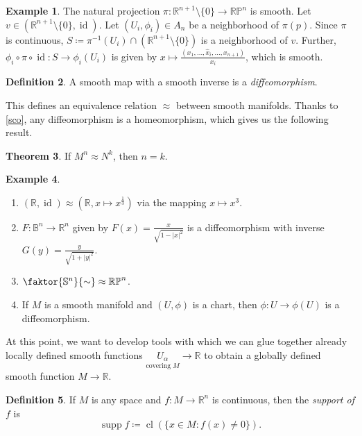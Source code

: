 \documentclass[10pt,letterpaper,cm]{nupset}
\theoremstyle{definition}
\newtheorem{definition}{Definition}[subsection]
\newtheorem{exmp}[definition]{Example}
\theoremstyle{theorem}
\newtheorem{theorem}[definition]{Theorem}
\theoremstyle{remark}
\newcommand{\R}{\mathbb R}
\newcommand{\RP}{\mathbb{RP}}
\renewcommand{\S}{\mathbb S}
\newcommand{\B}{\mathbb{B}}
\newcommand{\1}{\mathbf{1}}
\newcommand{\0}{\vec 0}
\DeclareMathOperator{\id}{id}
\DeclareMathOperator{\supp}{supp}
\DeclareMathOperator{\cl}{cl}
\begin{document}
\begin{exmp}
The natural projection $\pi : \R^{n+1}\setminus \{0\} \to \RP^n$ is smooth. Let $v \in \left(\R^{n+1} \setminus \{0\}, \id\right)$. Let $(U_i, \phi_i) \in A_n$ be a neighborhood of $\pi(p)$. Since $\pi$ is continuous, $S \coloneqq  \pi^{-1}(U_i) \cap  (\R^{n+1} \setminus \{0\})$ is a neighborhood of $v$. Further, $\phi_i \circ \pi \circ \id : S \to \phi_i(U_i)$ is given by $x\mapsto \frac{(x_1, \ldots, \hat{x}_i, \ldots, x_{n+1})}{x_i}$, which is smooth.
\end{exmp}

\begin{definition} 
A smooth map with a smooth inverse is a \textit{diffeomorphism}.
\end{definition}

This defines an equivalence relation $\approx$ between smooth manifolds. Thanks to \cref{sco}, any diffeomorphism is a homeomorphism, which gives us the following result.

\begin{theorem} 
 If $M^n \approx N^k$, then $n =k$.
\end{theorem}


\begin{exmp} $ $
\begin{enumerate}
\item $\left(\R, \id\right) \approx \left(\R, x\mapsto x^{\frac{1}{3}}\right)$ via the mapping $ x \mapsto x^3$.
\item $F: \B^n \to \R^n$ given by $F(x) = \frac{x}{\sqrt{1-\lvert{x}\rvert^2}}$ is a diffeomorphism with inverse $G(y) = \frac{y}{\sqrt{1+\lvert{y}\rvert^2}}$.
\item  $\faktor{\S^n}{\sim} \approx \RP^n$.
\item If $M$ is a smooth manifold and $(U, \phi)$ is a chart, then $\phi: U \to \phi(U)$ is a diffeomorphism.
\end{enumerate}
\end{exmp}


 \bigskip
 
 At this point, we want to develop tools with which we can glue together already locally defined smooth functions $\underset{\text{covering } M}{U_{\alpha}} \to \R$ to obtain a globally defined smooth function $M\to \R$.
 
\begin{definition}
If $M$ is any space and $f:M \to \R^n$ is continuous, then the \textit{support of $f$} is $$\supp f \coloneqq  \cl\left(\{x \in M: f(x) \ne 0\}\right).$$
\end{definition}
\end{document}
